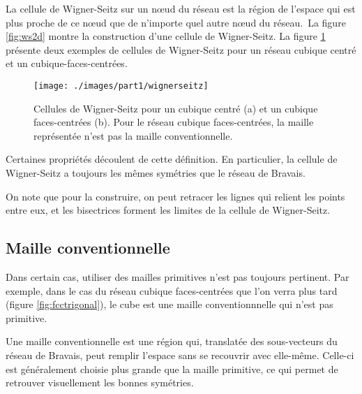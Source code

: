 La cellule de Wigner-Seitz sur un nœud du réseau est la région de l'espace qui est plus proche de ce nœud que de n'importe quel autre nœud du réseau. La figure \ref{fig:ws2d} montre la construction d'une cellule de Wigner-Seitz. La figure \ref{fig:ws} présente deux exemples de cellules de Wigner-Seitz pour un réseau cubique centré et un cubique-faces-centrées.

\begin{figure}
\texttt{[image: ./images/part1/wignerseitz]}
\caption{Cellules de Wigner-Seitz pour un cubique centré (a) et un cubique faces-centrées (b). Pour le réseau cubique faces-centrées, la maille représentée n'est pas la maille conventionnelle.}
\label{fig:ws}
\end{figure}

Certaines propriétés découlent de cette définition. En particulier, la cellule de Wigner-Seitz a toujours les mêmes symétries que le réseau de Bravais.

On note que pour la construire, on peut retracer les lignes qui relient les points entre eux, et les bisectrices forment les limites de la cellule de Wigner-Seitz.

\subsection{Maille conventionnelle}

Dans certain cas, utiliser des mailles primitives n'est pas toujours pertinent. Par exemple, dans le cas du réseau cubique faces-centrées que l'on verra plus tard (figure \ref{fig:fcctrigonal}), le cube est une maille conventionnnelle qui n'est pas primitive.

Une maille conventionnelle est une région qui, translatée des sous-vecteurs du réseau de Bravais, peut remplir l'espace sans se recouvrir avec elle-même. Celle-ci est généralement choisie plus grande que la maille primitive, ce qui permet de retrouver visuellement les bonnes symétries.
